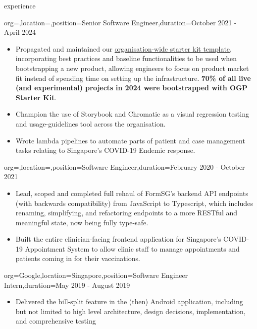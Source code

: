 \documentclass{resume}
\begin{document}
\begin{ResumeSection}{experience}
\begin{ResumeSubsection}{org=,location=,position={Senior Software Engineer},duration=October 2021 - April 2024}
\begin{itemize}
            \item Propagated and maintained our \href{https://start.open.gov.sg/}{organisation-wide starter kit template}, incorporating best practices and baseline functionalities to be used when bootstrapping a new product, allowing engineers to focus on product market fit instead of spending time on setting up the infrastructure. \textbf{70\% of all live (and experimental) projects in 2024 were bootstrapped with OGP Starter Kit}.
            \item Champion the use of Storybook and Chromatic as a visual regression testing and usage-guidelines tool across the organisation.
            \item Wrote lambda pipelines to automate parts of patient and case management tasks relating to Singapore’s COVID-19 Endemic response.
        \end{itemize}
        \medskip
    \end{ResumeSubsection}
    \begin{ResumeSubsection}{org=,location=,position={Software Engineer},duration=February 2020 - October 2021}
        \begin{itemize}
            \item Lead, scoped and completed full rehaul of FormSG’s backend API endpoints (with backwards compatibility) from JavaScript to Typescript, which includes renaming, simplifying, and refactoring endpoints to a more RESTful and meaningful state, now being fully type-safe.
            \item Built the entire clinician-facing frontend application for Singapore’s COVID-19 Appointment System to allow clinic staff to manage appointments and patients coming in for their vaccinations.
        \end{itemize}
        \bigskip
    \end{ResumeSubsection}
    \begin{ResumeSubsection}{org=Google,location={Singapore},position={Software Engineer Intern},duration=May 2019 - August 2019}
        \begin{itemize} 
            \item Delivered the bill-split feature in the (then) Android application, including but not limited to high level architecture, design decisions, implementation, and comprehensive testing
        \end{itemize}
        \bigskip
    \end{ResumeSubsection}
\end{ResumeSection}
\end{document}
